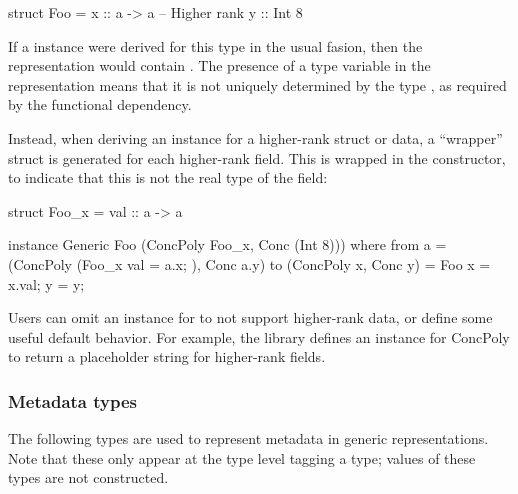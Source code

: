 \begin{libverbatim}
   struct Foo =
      x :: a -> a -- Higher rank
      y :: Int 8
\end{libverbatim}

If a  instance were derived for this type in the usual fasion,
then the representation would contain .
The presence of a type variable in the representation means that it is not uniquely determined by the type ,
as required by the functional dependency.

Instead, when deriving an instance for a higher-rank struct or data, a ``wrapper'' struct is generated
for each higher-rank field.  This is wrapped in the  constructor, to indicate that this
is not the real type of the field:

\begin{libverbatim}
   struct Foo_x =
     val :: a -> a

   instance Generic Foo (ConcPoly Foo_x, Conc (Int 8))) where
     from a = (ConcPoly (Foo_x { val = a.x; }), Conc a.y)
     to (ConcPoly x, Conc y) = Foo { x = x.val; y = y; }
\end{libverbatim}

Users can omit an instance for  to not support higher-rank data,
or define some useful default behavior.
For example, the  library defines an instance for ConcPoly
to return a placeholder string for higher-rank fields.

\subsubsection{Metadata types}

The following types are used to represent metadata in generic representations.
Note that these only appear at the type level tagging a  type;
values of these types are not constructed.

